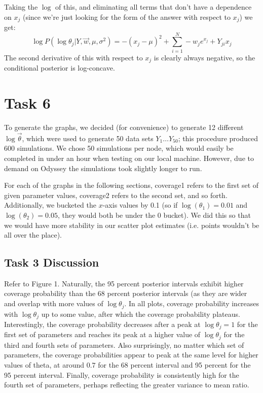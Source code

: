 \documentclass[10pt]{article}
\begin{document}
Taking the $\log$ of this, and eliminating all terms that don't have a dependence on $x_j$ (since we're just looking for the form of the answer with respect to $x_j$) we get:
\[\log P(\log \theta_j | Y, \vec{w}, \mu, \sigma^2 ) = -(x_j-\mu)^2 + \sum_{i=1}^N -w_je^{x_j} + Y_{ji}x_j\]
The second derivative of this with respect to $x_j$ is clearly always negative, so the conditional posterior is log-concave.


\section{Task 6}
To generate the graphs, we decided (for convenience) to generate 12 different $\log\vec{\theta}$, which were used to generate 50 data sets $Y_1\ldots Y_{50}$; this procedure produced 600 simulations. We chose 50 simulations per node, which would easily be completed in under an hour when testing on our local machine. However, due to demand on Odyssey the simulations took slightly longer to run.

For each of the graphs in the following sections, coverage1 refers to the first set of given parameter values, coverage2 refers to the second set, and so forth. Additionally, we bucketed the $x$-axis values by 0.1 (so if $\log(\theta_1) = 0.01$ and $\log(\theta_2) = 0.05$, they would both be under the $0$ bucket). We did this so that we would have more stability in our scatter plot estimates (i.e. points wouldn't be all over the place).
\subsection{Task 3 Discussion}
Refer to Figure 1. Naturally, the 95 percent posterior intervals exhibit higher coverage probability than the 68 percent posterior intervals (as they are wider and overlap with more values of $\log\theta_j$. In all plots, coverage probability increases with $\log\theta_j$ up to some value, after which the coverage probability plateaus. Interestingly, the coverage probability decreases after a peak at \approx $\log\theta_j = 1$ for the first set of parameters and reaches its peak at a higher value of $\log\theta_j$ for the third and fourth sets of parameters. Also surprisingly, no matter which set of parameters, the coverage probabilities appear to peak at the same level for higher values of theta, at around $0.7$ for the 68 percent interval and 95 percent for the 95 percent interval. Finally, coverage probability is consistently high for the fourth set of parameters, perhaps reflecting the greater variance to mean ratio.
\end{document}
